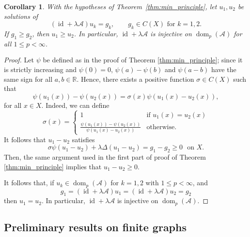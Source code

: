 \documentclass[journal]{article}
\theoremstyle{nonitalic}
\theoremstyle{nonitalic}
\theoremstyle{plain} %
\newtheorem{corollary}[theorem]{Corollary}
\numberwithin{equation}{section}
\newcommand{\dom}{\operatorname{dom}}
\begin{document}
\begin{corollary}\label{cor:min}
With the hypotheses of Theorem~\ref{thm:min_principle}, let $u_1, u_2$ be solutions of
$$
\left({\operatorname{id}} + \lambda\mathcal A\right) u_k = g_k, \qquad   g_k \in C(X) \mbox{ for } k=1,2.
$$
If $g_1\geq g_2$, then $u_1 \geq u_2$. In particular,  ${\operatorname{id}} +\lambda \mathcal{A}$ is injective on $\dom_p(\mathcal A)$ for all $1\leq p< \infty$.  
\end{corollary}
\begin{proof}
Let $\psi$ be defined as in the proof of Theorem \ref{thm:min_principle}; since it  is strictly increasing and $\psi(0)=0$, $\psi(a)-\psi(b)$ and $\psi(a-b)$ have the same sign for all $a,b\in\mathbb R$. Hence,    
there exists a positive function $\sigma\in C(X)$ such that
\[
\psi(u_1(x))-\psi(u_2(x))=\sigma(x) \psi(u_1(x)-u_2(x)),
\]
for all $x \in X$.
Indeed, we can define
\[
\sigma(x)=
\begin{cases}
1&\text{if } u_1(x)=u_2(x)\\
\frac{\psi(u_1(x))-\psi(u_2(x))}{\psi(u_1(x)-u_2(x))} &\text{otherwise}.
\end{cases}
\]
It follows that $u_1-u_2$ satisfies
\[
\sigma\psi(u_1-u_2) + \lambda \Delta(u_1-u_2)= g_1-g_2\geq 0 \,\,\text{ on } X.
\]
Then, the same argument used in the first part of proof of Theorem \ref{thm:min_principle} implies that $u_1-u_2\geq 0$. 



    It follows that, if $u_k \in \dom_p(\mathcal A)$ for $k=1,2$ with $1\leq p< \infty$,  
    and
$$
g_1 =\left({\operatorname{id}} + \lambda\mathcal A\right) u_1 = \left({\operatorname{id}} + \lambda\mathcal A\right) u_2 = g_2
$$
then $u_1 = u_2$. In particular, ${\operatorname{id}} +\lambda \mathcal{A}$ is injective on $\dom_p(\mathcal A)$.  
\end{proof}
 



\subsection{Preliminary results on finite graphs}\label{finite}
\end{document}
